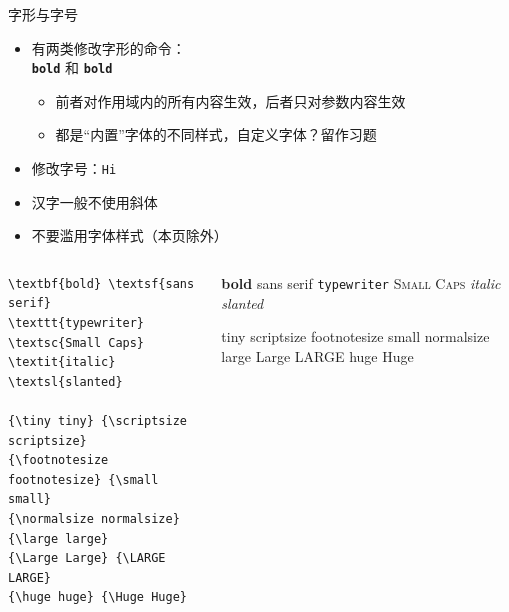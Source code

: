 \begin{frame}[fragile]{字形与字号}
\begin{itemize}
    \item 有两类修改字形的命令：\\\texttt{{\bfseries bold}} 和 \texttt{\textbf{bold}}
    \begin{itemize}
        \item 前者对作用域内的所有内容生效，后者只对参数内容生效
        \item 都是“内置”字体的不同样式，自定义字体？留作习题
    \end{itemize}
    \item 修改字号：\texttt{{\large Hi}}
    \item \alert{汉字一般不使用斜体}
    \pause
    \item \alert{不要滥用字体样式}{\scriptsize（本页除外）} 
\end{itemize}
\pause
\begin{columns}
    \begin{column}{0.62\textwidth}
        \begin{verbatim}
\textbf{bold} \textsf{sans serif}
\texttt{typewriter} \textsc{Small Caps}
\textit{italic} \textsl{slanted}

{\tiny tiny} {\scriptsize scriptsize}
{\footnotesize footnotesize} {\small small}
{\normalsize normalsize} {\large large}
{\Large Large} {\LARGE LARGE}
{\huge huge} {\Huge Huge}
        \end{verbatim}
    \end{column}
    \begin{column}{0.39\textwidth}\vspace{-2em}

\textbf{bold} \textsf{sans serif}
\texttt{typewriter} \textsc{Small Caps}
\textit{italic} {\textsl{slanted}}

{\tiny tiny} {\scriptsize scriptsize}
{\footnotesize footnotesize} {\small small}
{\normalsize normalsize} {\large large}
{\Large Large} {\LARGE LARGE}
{\huge huge} {\Huge Huge}
    \end{column}
\end{columns}
\end{frame}
  
